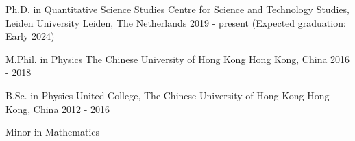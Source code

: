 

\begin{cventries}

  \cventry
    {Ph.D. in Quantitative Science Studies} %
    {Centre for Science and Technology Studies, Leiden University} %
    {Leiden, The Netherlands} %
    {2019 - present (Expected graduation: Early 2024)} %
    {}

  \cventry
    {M.Phil. in Physics} %
    {The Chinese University of Hong Kong} %
    {Hong Kong, China} %
    {2016 - 2018} %
    {}

  \cventry
    {B.Sc. in Physics} %
    {United College, The Chinese University of Hong Kong} %
    {Hong Kong, China} %
    {2012 - 2016} %
    {
      \begin{cvitems} %
        \item {Minor in Mathematics}
      \end{cvitems}
    }

\end{cventries}
